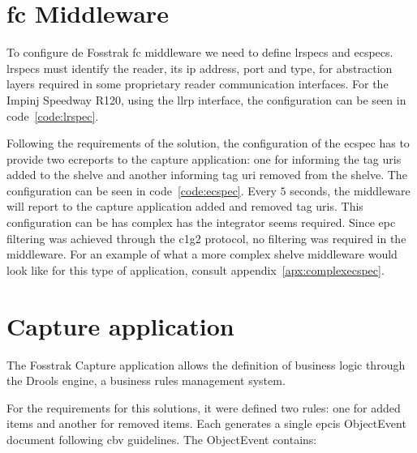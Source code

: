 \section{\acs{fc} Middleware}

To configure de Fosstrak \ac{fc} middleware we need to define \acp{lrspec} and \acp{ecspec}.
\acp{lrspec} must identify the reader, its \ac{ip} address, port and type, for abstraction layers required in some proprietary reader communication interfaces.
For the Impinj Speedway R120, using the \ac{llrp} interface, the configuration can be seen in code~\ref{code:lrspec}.

Following the requirements of the solution, the configuration of the \ac{ecspec} has to provide two \acp{ecreport} to the capture application: one for informing the tag \acp{uri} added to the shelve and another informing tag \ac{uri} removed from the shelve.
The configuration can be seen in code~\ref{code:ecspec}.
Every $5$ seconds, the middleware will report to the capture application added and removed tag \acp{uri}.
This configuration can be has complex has the integrator seems required. Since \ac{epc} filtering was achieved through the \ac{c1g2} protocol, no filtering was required in the middleware. For an example of what a more complex shelve middleware would look like for this type of application, consult appendix~\ref{apx:complexecspec}.

\section{Capture application}

The Fosstrak Capture application allows the definition of business logic through the Drools engine, a business rules management system.

For the requirements for this solutions, it were defined two rules: one for added items and another for removed items. Each generates a single \ac{epcis} ObjectEvent document following \ac{cbv} guidelines. The ObjectEvent contains:

